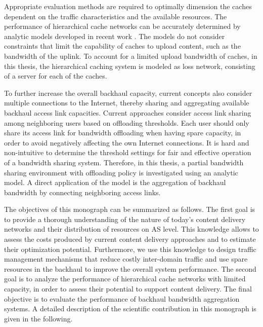Appropriate evaluation methods are required to optimally dimension the caches dependent on the traffic characteristics and the available resources.
The performance of hierarchical cache networks can be accurately determined by analytic models developed in recent work \cite{che2002hierarchical, martina2014unified}.
The models do not consider constraints that limit the capability of caches to upload content, such as the bandwidth of the uplink.
To account for a limited upload bandwidth of caches, in this thesis, the hierarchical caching system is modeled as loss network, consisting of a server for each of the caches.

To further increase the overall backhaul capacity, current concepts also consider multiple connections to the Internet, thereby sharing and aggregating available backhaul access link capacities.
Current approaches consider access link sharing among neighboring users based on offloading thresholds.
Each user should only share its access link for bandwidth offloading when having spare capacity, in order to avoid negatively affecting the own Internet connections.
It is hard and non-intuitive to determine the threshold settings for fair and effective operation of a bandwidth sharing system.
Therefore, in this thesis, a partial bandwidth sharing environment with offloading policy is investigated using an analytic model.
A direct application of the model is the aggregation of backhaul bandwidth by connecting neighboring access links.

The objectives of this monograph can be summarized as follows.
The first goal is to provide a thorough understanding of the nature of today's content delivery networks and their distribution of resources on AS level.
This knowledge allows to assess the costs produced by current content delivery approaches and to estimate their optimization potential.
Furthermore, we use this knowledge to design traffic management mechanisms that reduce costly inter-domain traffic and use spare resources in the backhaul to improve the overall system performance.
The second goal is to analyze the performance of hierarchical cache networks with limited capacity, in order to assess their potential to support content delivery.
The final objective is to evaluate the performance of backhaul bandwidth aggregation systems.
A detailed description of the scientific contribution in this monograph is given in the following.


